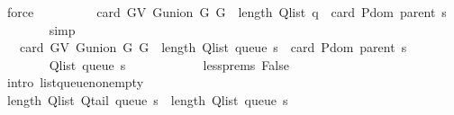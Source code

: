 \begin{isabellebody}
\ force\isanewline
\ \ \ \ \isamarkupfalse%
\ \isamarkupfalse%
\ {\isachardoublequoteopen}{\isachardot}{\kern0pt}{\isachardot}{\kern0pt}{\isachardot}{\kern0pt}\ {\isacharequal}{\kern0pt}\ card\ {\isacharparenleft}{\kern0pt}G{\isachardot}{\kern0pt}V\ {\isacharparenleft}{\kern0pt}G{\isachardot}{\kern0pt}union\ G{}\ G{}{\isacharparenright}{\kern0pt}{\isacharparenright}{\kern0pt}\ {\isacharplus}{\kern0pt}\ length\ {\isacharparenleft}{\kern0pt}Q{\isacharunderscore}{\kern0pt}list\ {\isacharquery}{\kern0pt}q{\isacharparenright}{\kern0pt}\ {\isacharminus}{\kern0pt}\ card\ {\isacharparenleft}{\kern0pt}P{\isachardot}{\kern0pt}dom\ {\isacharparenleft}{\kern0pt}parent\ s{\isacharparenright}{\kern0pt}{\isacharparenright}{\kern0pt}{\isachardoublequoteclose}\isanewline
\ \ \ \ \ \ \isamarkupfalse%
\ simp\isanewline
\ \ \ \ \isamarkupfalse%
\ \isamarkupfalse%
\ {\isachardoublequoteopen}{\isachardot}{\kern0pt}{\isachardot}{\kern0pt}{\isachardot}{\kern0pt}\ {\isacharless}{\kern0pt}\ card\ {\isacharparenleft}{\kern0pt}G{\isachardot}{\kern0pt}V\ {\isacharparenleft}{\kern0pt}G{\isachardot}{\kern0pt}union\ G{}\ G{}{\isacharparenright}{\kern0pt}{\isacharparenright}{\kern0pt}\ {\isacharplus}{\kern0pt}\ length\ {\isacharparenleft}{\kern0pt}Q{\isacharunderscore}{\kern0pt}list\ {\isacharparenleft}{\kern0pt}queue\ s{\isacharparenright}{\kern0pt}{\isacharparenright}{\kern0pt}\ {\isacharminus}{\kern0pt}\ card\ {\isacharparenleft}{\kern0pt}P{\isachardot}{\kern0pt}dom\ {\isacharparenleft}{\kern0pt}parent\ s{\isacharparenright}{\kern0pt}{\isacharparenright}{\kern0pt}{\isachardoublequoteclose}\isanewline
\ \ \ \ \isamarkupfalse%
\ {\isacharminus}{\kern0pt}\isanewline
\ \ \ \ \ \ \isamarkupfalse%
\ {\isachardoublequoteopen}Q{\isacharunderscore}{\kern0pt}list\ {\isacharparenleft}{\kern0pt}queue\ s{\isacharparenright}{\kern0pt}\ {\isasymnoteq}\ {\isacharbrackleft}{\kern0pt}{\isacharbrackright}{\kern0pt}{\isachardoublequoteclose}\isanewline
\ \ \ \ \ \ \ \ \isamarkupfalse%
\ less{\isachardot}{\kern0pt}prems{\isacharparenleft}{\kern0pt}{}{\isacharparenright}{\kern0pt}\ False\isanewline
\ \ \ \ \ \ \ \ \isamarkupfalse%
\ {\isacharparenleft}{\kern0pt}intro\ list{\isacharunderscore}{\kern0pt}queue{\isacharunderscore}{\kern0pt}non{\isacharunderscore}{\kern0pt}empty{\isacharparenright}{\kern0pt}\isanewline
\ \ \ \ \ \ \isamarkupfalse%
\ {\isachardoublequoteopen}length\ {\isacharparenleft}{\kern0pt}Q{\isacharunderscore}{\kern0pt}list\ {\isacharparenleft}{\kern0pt}Q{\isacharunderscore}{\kern0pt}tail\ {\isacharparenleft}{\kern0pt}queue\ s{\isacharparenright}{\kern0pt}{\isacharparenright}{\kern0pt}{\isacharparenright}{\kern0pt}\ {\isacharless}{\kern0pt}\ length\ {\isacharparenleft}{\kern0pt}Q{\isacharunderscore}{\kern0pt}list\ {\isacharparenleft}{\kern0pt}queue\ s{\isacharparenright}{\kern0pt}{\isacharparenright}{\kern0pt}{\isachardoublequoteclose}\isanewline

\end{isabellebody}
